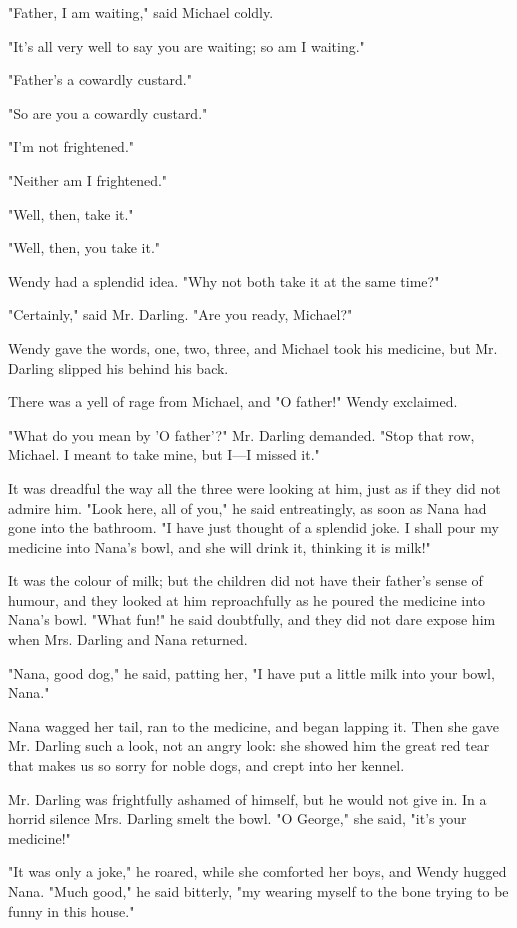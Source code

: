 "Father, I am waiting," said Michael coldly.


"It's all very well to say you are waiting; so am I waiting."


"Father's a cowardly custard."


"So are you a cowardly custard."


"I'm not frightened."


"Neither am I frightened."


"Well, then, take it."


"Well, then, you take it."


Wendy had a splendid idea. "Why not both take it at the same time?"


"Certainly," said Mr. Darling. "Are you ready, Michael?"


Wendy gave the words, one, two, three, and Michael took his medicine, but
Mr. Darling slipped his behind his back.


There was a yell of rage from Michael, and "O father!" Wendy exclaimed.


"What do you mean by 'O father'?" Mr. Darling demanded. "Stop that row,
Michael. I meant to take mine, but I—I missed it."


It was dreadful the way all the three were looking at him, just as if they
did not admire him. "Look here, all of you," he said entreatingly, as soon
as Nana had gone into the bathroom. "I have just thought of a splendid
joke. I shall pour my medicine into Nana's bowl, and she will drink it,
thinking it is milk!"


It was the colour of milk; but the children did not have their father's
sense of humour, and they looked at him reproachfully as he poured the
medicine into Nana's bowl. "What fun!" he said doubtfully, and they did
not dare expose him when Mrs. Darling and Nana returned.


"Nana, good dog," he said, patting her, "I have put a little milk into
your bowl, Nana."


Nana wagged her tail, ran to the medicine, and began lapping it. Then she
gave Mr. Darling such a look, not an angry look: she showed him the great
red tear that makes us so sorry for noble dogs, and crept into her kennel.


Mr. Darling was frightfully ashamed of himself, but he would not give in.
In a horrid silence Mrs. Darling smelt the bowl. "O George," she said,
"it's your medicine!"


"It was only a joke," he roared, while she comforted her boys, and Wendy
hugged Nana. "Much good," he said bitterly, "my wearing myself to the bone
trying to be funny in this house."


